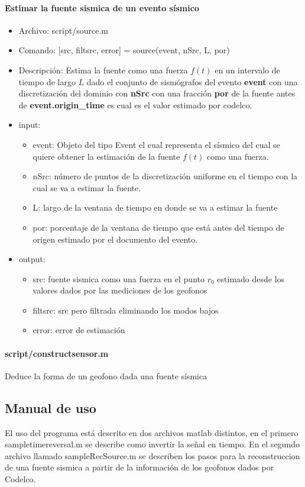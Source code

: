 \paragraph{Estimar la fuente sismica de un evento sísmico}
\begin{itemize}
  \item Archivo: script/source.m
  \item Comando: [src, filtsrc, error] = source(event, nSrc, L, por)
  \item Descripción: Estima la fuente como una fuerza $f(t)$ en un intervalo de 
  tiempo de largo $L$ dado el conjunto de sismógrafos del evento
  \textbf{event} con una discretización del dominio con \textbf{nSrc} con una
  fracción \textbf{por} de la fuente antes de \textbf{event.origin\_time} es
  cual es el valor estimado por codelco.
  \item input: 
    \begin{itemize}
    \item event: Objeto del tipo Event el cual representa el sísmico del cual se
    quiere obtener la estimación de la fuente $f(t)$ como una fuerza.
    \item nSrc: número de puntos de la discretización uniforme en el tiempo con
    la cual se va a estimar la fuente.
    \item L: largo de la ventana de tiempo en donde se va a estimar la fuente
    \item por: porcentaje de la ventana de tiempo que está antes del tiempo de
    origen estimado por el documento del evento.
    \end{itemize}
  \item output:
  	\begin{itemize}
  	  \item src: fuente sismica como una fuerza en el punto $r_0$ estimado desde
  	  los valores dados por las mediciones de los geofonos
  	  \item filtsrc: src pero filtrada eliminando los modos bajos
  	  \item error: error de estimación 
  	\end{itemize}
\end{itemize}

\paragraph{script/constructsensor.m}

Deduce la forma de un geofono dada una fuente sísmica
\subsection{Manual de uso}
El uso del programa está descrito en dos archivos matlab distintos, en el 
primero sampletimereversal.m se describe como invertir la señal en tiempo. En el
segundo archivo llamado sampleRecSource.m se describen los pasos para la 
reconstruccion de una fuente sismica a partir de la información de los geofonos 
dados por Codelco.


